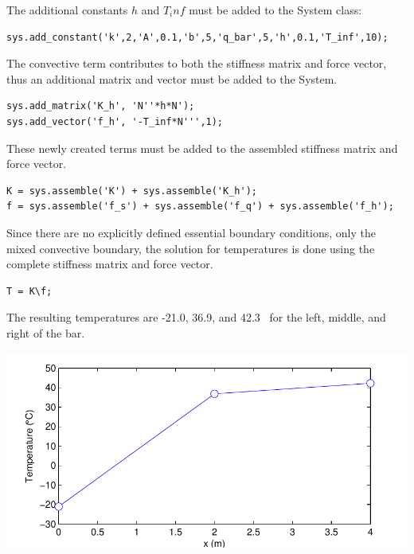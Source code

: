 The additional constants $h$ and $T_inf$ must be added to the System class:
\begin{lstlisting}
sys.add_constant('k',2,'A',0.1,'b',5,'q_bar',5,'h',0.1,'T_inf',10); 
\end{lstlisting}

The convective term contributes to both the stiffness matrix and force vector, thus an additional matrix and vector must be added to the System.
\begin{lstlisting}
sys.add_matrix('K_h', 'N''*h*N');
sys.add_vector('f_h', '-T_inf*N''',1);
\end{lstlisting}

These newly created terms must be added to the assembled stiffness matrix and force vector.
\begin{lstlisting}
K = sys.assemble('K') + sys.assemble('K_h');
f = sys.assemble('f_s') + sys.assemble('f_q') + sys.assemble('f_h');
\end{lstlisting}

Since there are no explicitly defined essential boundary conditions, only the mixed convective boundary, the solution for temperatures is done using the complete stiffness matrix and force vector.
\begin{lstlisting}
T = K\f;
\end{lstlisting}

The resulting temperatures are -21.0, 36.9, and 42.3 \C ~for the left, middle, and right of the bar.
\begin{center}
\includegraphics{HW2/HW2-2/soln.pdf}
\end{center}